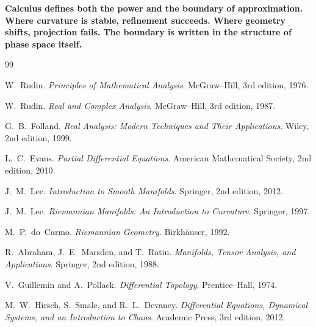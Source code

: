 \documentclass[12pt,openany]{book}
\begin{document}
\textbf{Calculus defines both the power and the boundary of approximation.
Where curvature is stable, refinement succeeds. Where geometry shifts,
projection fails. The boundary is written in the structure of phase space
itself.}

\clearpage

\begin{thebibliography}{99}

W.~Rudin.
\newblock \textit{Principles of Mathematical Analysis}.
\newblock McGraw--Hill, 3rd edition, 1976.

W.~Rudin.
\newblock \textit{Real and Complex Analysis}.
\newblock McGraw--Hill, 3rd edition, 1987.

G.~B.~Folland.
\newblock \textit{Real Analysis: Modern Techniques and Their Applications}.
\newblock Wiley, 2nd edition, 1999.

L.~C.~Evans.
\newblock \textit{Partial Differential Equations}.
\newblock American Mathematical Society, 2nd edition, 2010.

J.~M.~Lee.
\newblock \textit{Introduction to Smooth Manifolds}.
\newblock Springer, 2nd edition, 2012.

J.~M.~Lee.
\newblock \textit{Riemannian Manifolds: An Introduction to Curvature}.
\newblock Springer, 1997.

M.~P.~do~Carmo.
\newblock \textit{Riemannian Geometry}.
\newblock Birkh\"{a}user, 1992.

R.~Abraham, J.~E.~Marsden, and T.~Ratiu.
\newblock \textit{Manifolds, Tensor Analysis, and Applications}.
\newblock Springer, 2nd edition, 1988.

V.~Guillemin and A.~Pollack.
\newblock \textit{Differential Topology}.
\newblock Prentice--Hall, 1974.

M.~W.~Hirsch, S.~Smale, and R.~L.~Devaney.
\newblock \textit{Differential Equations, Dynamical Systems, and an
  Introduction to Chaos}.
\newblock Academic Press, 3rd edition, 2012.


\end{thebibliography}
\end{document}
